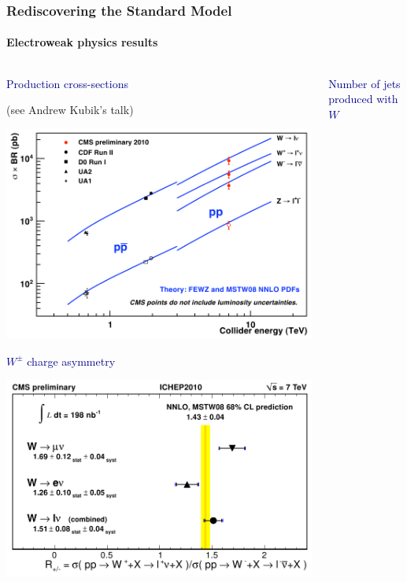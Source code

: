 \documentclass[compress]{beamer}
\begin{document}
\begin{frame}
\frametitle{Rediscovering the Standard Model}
\framesubtitle{Electroweak physics results}
\begin{columns}
\begin{center}
\textcolor{darkblue}{Production cross-sections}

(see Andrew Kubik's talk)

\includegraphics[width=\linewidth]{electroweak_crosssections.png}

\vspace{0.2 cm}
\textcolor{darkblue}{$W^\pm$ charge asymmetry}

\hfill \includegraphics[width=0.95\linewidth]{Wcharge_ratio.png}

\end{center}
\begin{center}
\textcolor{darkblue}{Number of jets produced with $W$}


\end{center}
\end{columns}
\end{frame}
\end{document}
